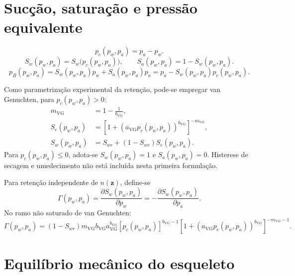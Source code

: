 \documentclass[11pt,a4paper]{article}
\begin{document}
\section{Suc\c{c}\~ao, satura\c{c}\~ao e press\~ao equivalente}

\begin{equation*}
\boxed{p_c(p_w,p_a)=p_a-p_w.}
\end{equation*}
\begin{equation*}
\boxed{S_w(p_w,p_a)=S_w\bigl(p_c(p_w,p_a)\bigr),\qquad
S_a(p_w,p_a)=1-S_w(p_w,p_a).}
\end{equation*}
\begin{equation*}
\boxed{p_B(p_w,p_a)=S_w(p_w,p_a)p_w+S_a(p_w,p_a)p_a
=p_a-S_w(p_w,p_a)p_c(p_w,p_a).}
\end{equation*}

Como parametriza\c{c}\~ao experimental da reten\c{c}\~ao, pode-se empregar
van Genuchten, para $p_c(p_w,p_a)>0$:
\begin{align*}
m_{\mathrm{VG}}&=1-\frac{1}{b_{\mathrm{VG}}},\\
S_e(p_w,p_a)&=\left[1+\left(a_{\mathrm{VG}}p_c(p_w,p_a)\right)^{b_{\mathrm{VG}}}\right]^{-m_{\mathrm{VG}}},\\
\boxed{S_w(p_w,p_a)}&\boxed{=S_{wr}+(1-S_{wr})S_e(p_w,p_a).}
\end{align*}
Para $p_c(p_w,p_a)\leq0$, adota-se $S_w(p_w,p_a)=1$ e
$S_a(p_w,p_a)=0$. Histerese de secagem e umedecimento n\~ao est\'a
inclu\'ida nesta primeira formula\c{c}\~ao.

Para reten\c{c}\~ao independente de $n(\mathbf z)$, define-se
\begin{equation*}
\boxed{\Gamma(p_w,p_a)=\frac{\partial S_w(p_w,p_a)}{\partial p_w}
=-\frac{\partial S_w(p_w,p_a)}{\partial p_a}.}
\end{equation*}
No ramo n\~ao saturado de van Genuchten:
\begin{equation*}
\Gamma(p_w,p_a)=(1-S_{wr})m_{\mathrm{VG}}b_{\mathrm{VG}}
a_{\mathrm{VG}}^{b_{\mathrm{VG}}}
[p_c(p_w,p_a)]^{b_{\mathrm{VG}}-1}
\left[1+\left(a_{\mathrm{VG}}p_c(p_w,p_a)\right)^{b_{\mathrm{VG}}}\right]^{-m_{\mathrm{VG}}-1}.
\end{equation*}

\section{Equil\'ibrio mec\^anico do esqueleto}\label{sec:equilibrio}
\end{document}
